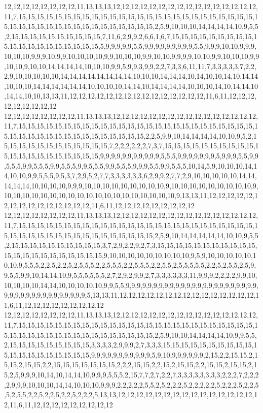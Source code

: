 12,12,12,12,12,12,12,12,11,13,13,13,12,12,12,12,12,12,12,12,12,12,12,12,12,12,12,12,11,7,15,15,15,15,15,15,15,15,15,15,15,15,15,15,15,15,15,15,15,15,15,15,15,15,15,15,15,15,15,15,15,15,15,15,15,15,15,15,15,15,15,15,15,2,5,9,10,10,10,14,14,14,14,10,9,5,5,2,15,15,15,15,15,15,15,15,15,15,7,11,6,2,9,9,2,6,6,1,6,7,15,15,15,15,15,15,15,15,15,15,15,15,15,15,15,15,15,15,15,15,5,9,9,9,9,9,5,5,9,9,9,9,9,9,9,9,9,5,5,9,9,9,10,10,9,9,9,10,10,10,9,9,9,10,9,9,10,10,10,10,9,9,10,10,10,9,9,10,10,9,9,9,9,10,10,9,9,10,10,10,9,9,10,10,9,10,10,14,14,14,14,10,10,10,9,9,5,9,9,3,9,9,2,2,7,3,3,6,11,11,7,3,3,3,3,3,7,2,2,2,9,10,10,10,10,10,14,14,14,14,14,14,14,14,10,10,10,14,14,14,10,14,10,10,14,10,14,14,10,10,10,14,14,14,14,14,14,10,10,10,10,14,14,10,14,14,14,14,10,10,10,14,10,14,14,10,14,14,10,10,13,13,11,12,12,12,12,12,12,12,12,12,12,12,12,12,12,12,11,6,11,12,12,12,12,12,12,12,12,12
12,12,12,12,12,12,12,12,11,13,13,13,12,12,12,12,12,12,12,12,12,12,12,12,12,12,12,12,11,7,15,15,15,15,15,15,15,15,15,15,15,15,15,15,15,15,15,15,15,15,15,15,15,15,15,15,15,15,15,15,15,15,15,15,15,15,15,15,15,15,15,15,2,2,5,9,9,10,14,14,14,14,10,10,9,5,2,15,15,15,15,15,15,15,15,15,15,15,15,7,2,2,2,2,2,2,7,3,7,15,15,15,15,15,15,15,15,15,15,15,15,15,15,15,15,15,15,15,15,15,9,9,9,9,9,9,9,9,9,9,9,5,5,5,9,9,9,9,9,9,9,5,9,9,9,5,5,9,9,5,5,5,9,9,5,5,5,9,9,5,5,5,9,9,5,5,5,9,9,5,5,5,9,9,9,5,5,9,9,5,5,5,10,14,5,9,10,10,10,14,14,10,10,9,9,5,5,5,9,5,3,7,2,9,5,2,7,7,3,3,3,3,3,3,6,2,9,9,2,7,7,2,9,10,10,10,10,10,14,14,14,14,14,10,10,10,10,9,9,9,10,10,10,10,10,10,10,10,10,9,10,10,10,10,10,10,10,10,10,9,10,10,10,10,10,10,10,10,10,10,10,10,10,10,10,10,10,10,10,9,13,13,11,12,12,12,12,12,12,12,12,12,12,12,12,12,12,12,11,6,11,12,12,12,12,12,12,12,12,12
12,12,12,12,12,12,12,12,11,13,13,13,12,12,12,12,12,12,12,12,12,12,12,12,12,12,12,12,11,7,15,15,15,15,15,15,15,15,15,15,15,15,15,15,15,15,15,15,15,15,15,15,15,15,15,15,15,15,15,15,15,15,15,15,15,15,15,15,15,15,15,15,15,2,5,9,10,14,14,14,14,14,10,10,9,5,5,2,15,15,15,15,15,15,15,15,15,15,3,7,2,9,2,2,9,2,7,3,15,15,15,15,15,15,15,15,15,15,15,15,15,15,15,15,15,15,15,15,15,15,9,10,10,10,10,10,10,10,10,10,9,5,9,10,10,10,10,10,10,10,9,5,5,5,2,2,5,2,2,5,2,5,5,5,2,2,5,5,5,2,2,5,5,5,2,2,5,5,2,5,5,5,5,5,2,2,5,2,5,5,2,5,9,9,5,5,9,9,10,14,14,10,9,5,5,5,5,5,5,2,7,2,9,2,9,9,2,7,3,3,3,3,3,3,11,9,9,9,2,2,2,2,9,9,10,10,10,10,10,14,14,10,10,10,10,10,9,9,5,5,9,9,9,9,9,9,9,9,9,9,9,9,9,9,9,9,9,9,9,9,9,9,9,9,9,9,9,9,9,9,9,9,9,9,9,9,9,9,9,5,13,13,11,12,12,12,12,12,12,12,12,12,12,12,12,12,12,12,11,6,11,12,12,12,12,12,12,12,12,12
12,12,12,12,12,12,12,12,11,13,13,13,12,12,12,12,12,12,12,12,12,12,12,12,12,12,12,12,11,7,15,15,15,15,15,15,15,15,15,15,15,15,15,15,15,15,15,15,15,15,15,15,15,15,15,15,15,15,15,15,15,15,15,15,15,15,15,15,15,15,15,15,15,2,5,9,10,10,14,14,14,14,10,9,9,5,5,2,15,15,15,15,15,15,15,15,15,3,3,3,3,2,9,9,9,2,7,3,3,3,15,15,15,15,15,15,15,15,15,15,15,15,15,15,15,15,15,15,15,15,9,9,9,9,9,9,9,9,9,9,9,5,9,10,9,9,9,9,9,9,2,15,2,2,15,15,2,15,15,2,15,15,2,2,15,15,15,15,15,15,15,2,2,2,15,15,2,2,15,2,15,15,2,2,15,15,2,15,15,2,15,2,5,9,9,9,10,14,10,14,14,10,9,9,9,5,5,5,2,15,7,7,2,7,2,2,7,3,3,3,3,3,3,3,3,2,2,2,7,2,2,2,2,9,9,9,10,10,10,14,14,10,10,10,9,9,9,2,2,2,2,2,5,5,2,5,2,2,2,5,2,2,2,2,2,5,2,2,2,5,2,2,5,5,2,5,5,2,2,5,2,2,5,2,2,5,2,2,2,5,13,13,12,12,12,12,12,12,12,12,12,12,12,12,12,12,12,12,11,6,11,12,12,12,12,12,12,12,12,12
